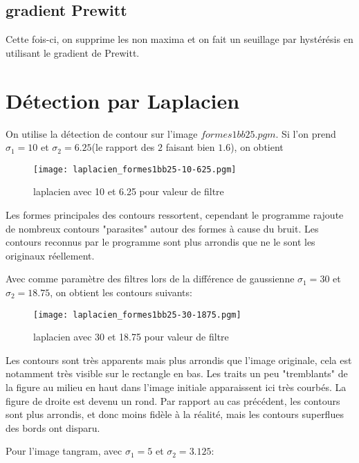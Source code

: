 \documentclass[12pt]{article}
\numberwithin{equation}{section}
\begin{document}
\subsection{gradient Prewitt}
Cette fois-ci, on supprime les non maxima et on fait un seuillage par hystérésis en utilisant le gradient de Prewitt.

\section{Détection par Laplacien}

On utilise la détection de contour sur l'image $formes1bb25.pgm$. Si l'on prend $\sigma_1=10$ et $\sigma_2=6.25$(le rapport des $2$ faisant bien $1.6$), on obtient

	\begin{figure}[!ht]
        \begin{center}
           \texttt{[image: laplacien\_formes1bb25-10-625.pgm]} 
           \caption{laplacien avec 10 et 6.25 pour valeur de filtre}
        \end{center}
    \end{figure}

Les formes principales des contours ressortent, cependant le programme rajoute de nombreux contours "parasites" autour des formes à cause du bruit. Les contours reconnus par le programme sont plus arrondis que ne le sont les originaux réellement.

Avec comme paramètre des filtres lors de la différence de gaussienne $\sigma_1=30$ et $\sigma_2=18.75$, on obtient les contours suivants:

	\begin{figure}[!ht]
        \begin{center}
           \texttt{[image: laplacien\_formes1bb25-30-1875.pgm]} 
           \caption{laplacien avec 30 et 18.75 pour valeur de filtre}
        \end{center}
    \end{figure}

Les contours sont très apparents mais plus arrondis que l'image originale, cela est notamment très visible sur le rectangle en bas. Les traits un peu "tremblants" de la figure au milieu en haut dans l'image initiale apparaissent ici très courbés. La figure de droite est devenu un rond. Par rapport au cas précédent, les contours sont plus arrondis, et donc moins fidèle à la réalité, mais les contours superflues des bords ont disparu. 

Pour l'image tangram, avec $\sigma_1=5$ et $\sigma_2=3.125$:
\end{document}
